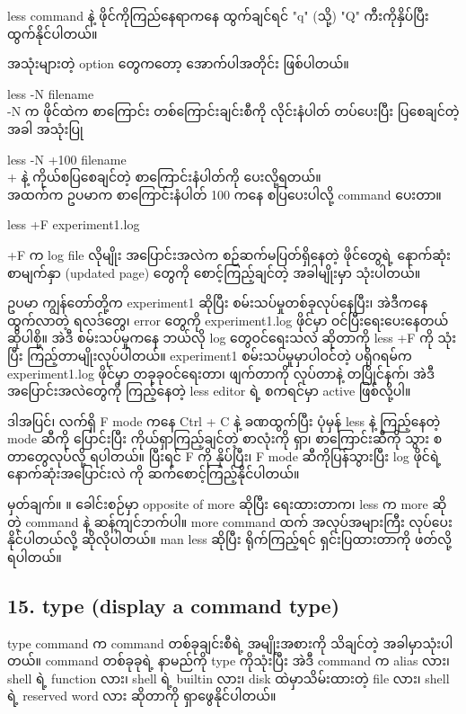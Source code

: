 \documentclass[11pt]{article}
\begin{document}
less command နဲ့ ဖိုင်ကိုကြည်နေရာကနေ ထွက်ချင်ရင် "q" (သို့) "Q"
ကီးကိုနှိပ်ပြီး ထွက်နိုင်ပါတယ်။

    အသုံးများတဲ့ option တွေကတော့ အောက်ပါအတိုင်း ဖြစ်ပါတယ်။

less -N filename\\
-N က ဖိုင်ထဲက စာကြောင်း တစ်ကြောင်းချင်းစီကို လိုင်းနံပါတ် တပ်ပေးပြီး
ပြစေချင်တဲ့ အခါ အသုံးပြု

less -N +100 filename\\
+ နဲ့ ကိုယ်စပြစေချင်တဲ့ စာကြောင်းနံပါတ်ကို ပေးလို့ရတယ်။\\
အထက်က ဥပမာက စာကြောင်းနံပါတ် 100 ကနေ စပြပေးပါလို့ command ပေးတာ။

less +F experiment1.log

+F က log file လိုမျိုး အပြောင်းအလဲက စဉ်ဆက်မပြတ်ရှိနေတဲ့ ဖိုင်တွေရဲ့
နောက်ဆုံးစာမျက်နှာ (updated page) တွေကို စောင့်ကြည့်ချင်တဲ့ အခါမျိုးမှာ
သုံးပါတယ်။

ဥပမာ ကျွန်တော်တို့က experiment1 ဆိုပြီး စမ်းသပ်မှုတစ်ခုလုပ်နေပြီး၊
အဲဒီကနေ ထွက်လာတဲ့ ရလဒ်တွေ၊ error တွေကို experiment1.log ဖိုင်မှာ
ဝင်ပြီးရေးပေးနေတယ်ဆိုပါစို့။ အဲဒီ စမ်းသပ်မှုကနေ ဘယ်လို log တွေဝင်ရေးသလဲ
ဆိုတာကို less +F ကို သုံးပြီး ကြည့်တာမျိုးလုပ်ပါတယ်။ experiment1
စမ်းသပ်မှုမှာပါဝင်တဲ့ ပရိုဂရမ်က experiment1.log ဖိုင်မှာ တခုခုဝင်ရေးတာ၊
ဖျက်တာကို လုပ်တာနဲ့ တပြိုင်နက်၊ အဲဒီအပြောင်းအလဲတွေကို ကြည့်နေတဲ့ less
editor ရဲ့ စကရင်မှာ active ဖြစ်လို့ပါ။

ဒါအပြင်၊ လက်ရှိ F mode ကနေ Ctrl + C နဲ့ ခဏထွက်ပြီး ပုံမှန် less နဲ့
ကြည့်နေတဲ့ mode ဆီကို ပြောင်းပြီး ကိုယ်ရှာကြည့်ချင်တဲ့ စာလုံးကို ရှာ၊
စာကြောင်းဆီကို သွား စတာတွေလုပ်လို့ ရပါတယ်။ ပြီးရင် F ကို နှိပ်ပြီး၊ F
mode ဆီကိုပြန်သွားပြီး log ဖိုင်ရဲ့ နောက်ဆုံးအပြောင်းလဲ ကို
ဆက်စောင့်ကြည့်နိုင်ပါတယ်။

မှတ်ချက်။ ။ ခေါင်းစဉ်မှာ opposite of more ဆိုပြီး ရေးထားတာက၊ less က more
ဆိုတဲ့ command နဲ့ ဆန့်ကျင်ဘက်ပါ။ more command ထက် အလုပ်အများကြီး
လုပ်ပေးနိုင်ပါတယ်လို့ ဆိုလိုပါတယ်။ man less ဆိုပြီး ရိုက်ကြည့်ရင်
ရှင်းပြထားတာကို ဖတ်လို့ရပါတယ်။

    \subsection{15. type (display a command
type)}\label{type-display-a-command-type}

type command က command တစ်ခုချင်းစီရဲ့ အမျိုးအစားကို သိချင်တဲ့
အခါမှာသုံးပါတယ်။ command တစ်ခုခုရဲ့ နာမည်ကို type ကိုသုံးပြီး အဲဒီ
command က alias လား၊ shell ရဲ့ function လား၊ shell ရဲ့ builtin လား၊ disk
ထဲမှာသိမ်းထားတဲ့ file လား၊ shell ရဲ့ reserved word လား ဆိုတာကို
ရှာဖွေနိုင်ပါတယ်။
\end{document}
